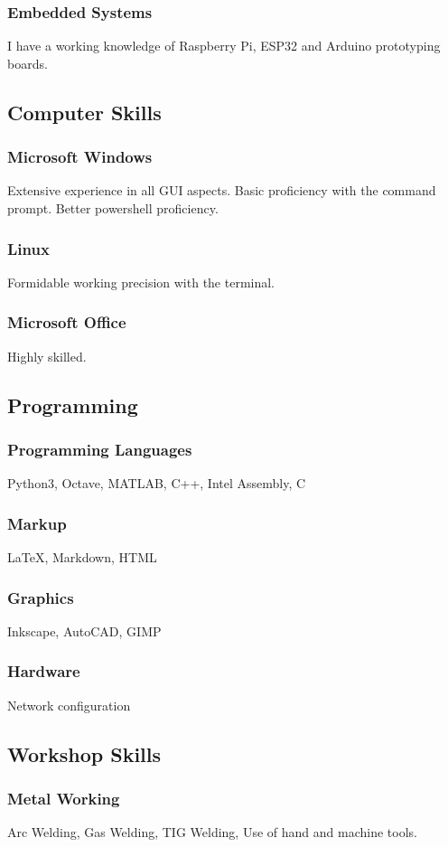 \documentclass[a4paper]{article}
\begin{document}
\subsubsection{Embedded Systems}
I have a working knowledge of Raspberry Pi, ESP32 and Arduino prototyping boards.

\subsection{Computer Skills}
\subsubsection{Microsoft Windows}
Extensive experience in all GUI aspects. Basic proficiency with the command prompt. Better powershell proficiency.
\subsubsection{Linux}
Formidable working precision with the terminal.
\subsubsection{Microsoft Office}
Highly skilled.

\subsection{Programming}
\subsubsection{Programming Languages}
Python3, Octave, MATLAB, C++, Intel Assembly, C
\subsubsection{Markup}
\LaTeX, Markdown, HTML
\subsubsection{Graphics}
Inkscape, AutoCAD, GIMP
\subsubsection{Hardware}
Network configuration

\subsection{Workshop Skills}
\subsubsection{Metal Working}
Arc Welding, Gas Welding, TIG Welding, Use of hand and machine tools.
\end{document}
